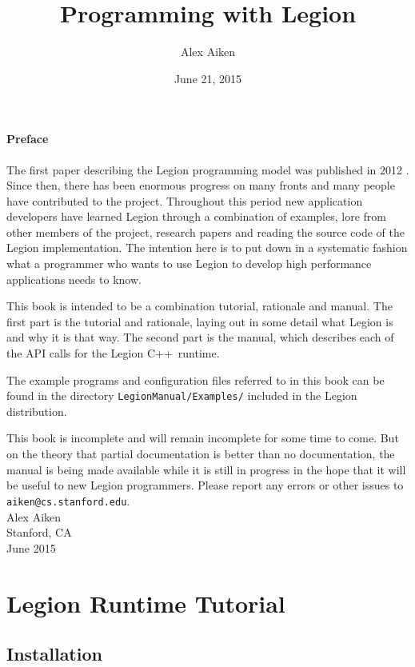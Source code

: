 \documentclass[11pt]{book}
\newcommand{\legionbook}[1]{{\tt LegionManual/Examples/#1}}
\newcommand{\Cpp}{C++}
\begin{document}
\title{Programming with Legion}
\author{Alex Aiken}
\date{June 21, 2015}
\maketitle

\subsection*{Preface}

The first paper describing the Legion programming model
was published in 2012 \cite{Legion12}.  Since then, there has been
enormous progress on many fronts and many people have contributed to
the project.  Throughout this period new application developers have
learned Legion through a combination of examples, lore from other
members of the project, research papers and reading the source code of
the Legion implementation.  The intention here is to put down in 
a systematic fashion what a programmer who wants to use
Legion to develop high performance applications needs to know.

This book is intended to be a combination tutorial, rationale and
manual.  The first part is the tutorial and rationale, laying out in some
detail what Legion is and why it is that way.  The second part is the manual, which describes
each of the API calls for the Legion \Cpp\ runtime.

The example programs and configuration files referred to in this book can be found in the directory
\legionbook{} included in the Legion distribution.

This book is incomplete and will remain incomplete for
some time to come.  But on the theory that partial documentation is better than no
documentation, the manual is being made available while it is
still in progress in the hope that it will be useful to new Legion
programmers.  Please report any errors or other issues to {\tt
  aiken@cs.stanford.edu}. \\[2in] Alex Aiken\\ Stanford, CA \\ June
2015

\tableofcontents

\part{Legion Runtime Tutorial}
\chapter{Installation}
\label{chap:start}
\end{document}
